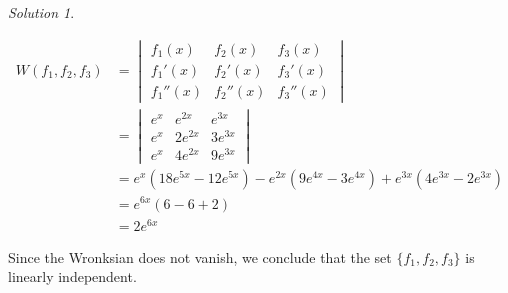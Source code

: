 \documentclass[12pt,a4paper]{article}
\theoremstyle{definition}
\theoremstyle{remark}
\newtheorem*{solution}{Solution}
\begin{document}
\begin{solution}
\begin{enumerate}
        \begin{align*}
            W(f_1, f_2, f_3) &= \begin{vmatrix}
                f_1(x) & f_2(x) & f_3(x) \\
                f_1'(x) & f_2'(x) & f_3'(x) \\
                f_1''(x) & f_2''(x) & f_3''(x) 
            \end{vmatrix} \\
            &= \begin{vmatrix}
                e^x & e^{2x} & e^{3x} \\
                e^{x} & 2e^{2x} & 3 e^{3x} \\
                e^x & 4 e^{2x} & 9 e^{3x}
            \end{vmatrix} \\
            &= e^{x}(18 e^{5x} - 12 e^{5x})- e^{2x}(9e^{4x}-3e^{4x}) + e^{3x}(4e^{3x}-2e^{3x}) \\
            &= e^{6x}(6-6+2)\\
            &= 2e^{6x}
        \end{align*}

        Since the Wronksian does not vanish, we conclude that the set $\{f_1, f_2, f_3\}$ is linearly independent. 
    \end{enumerate}
\end{solution}
\end{document}
